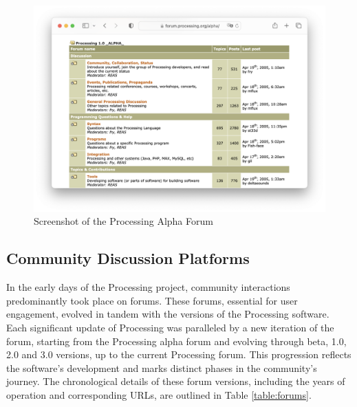 
\begin{figure}
	\centering
	\includegraphics[width=1.0\textwidth]{images/alpha-browser.png}
	\caption{Screenshot of the Processing Alpha Forum}
	\label{fig:processing-alpha}
\end{figure}

\subsection{Community Discussion Platforms}
In the early days of the Processing project, community interactions predominantly took place on forums. These forums, essential for user engagement, evolved in tandem with the versions of the Processing software. Each significant update of Processing was paralleled by a new iteration of the forum, starting from the Processing alpha forum and evolving through beta, 1.0, 2.0 and 3.0 versions, up to the current Processing forum. This progression reflects the software’s development and marks distinct phases in the community's journey. The chronological details of these forum versions, including the years of operation and corresponding URLs, are outlined in Table \ref{table:forums}. \parencite{ProcessingForum}

